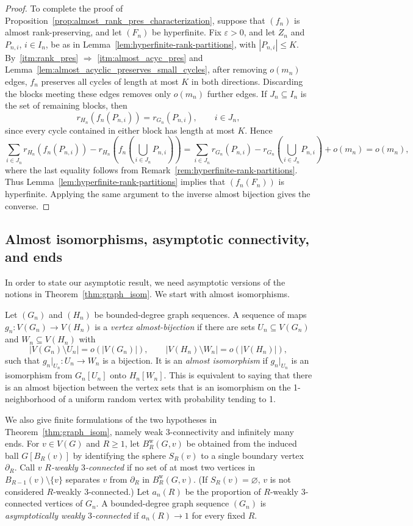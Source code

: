 \documentclass{article}
\theoremstyle{plain}
\theoremstyle{definition}
\begin{document}
\begin{proof}
To complete the proof of Proposition~\ref{prop:almost_rank_pres_characterization}, suppose that $(f_n)$ is almost rank-preserving, and let $(F_n)$ be hyperfinite. Fix $\varepsilon>0$, and let $Z_n$ and $P_{n,i}$, $i\in I_n$, be as in Lemma~\ref{lem:hyperfinite-rank-partitions}, with $|P_{n,i}|\leq K$. By~\ref{itm:rank_pres} $\Rightarrow$ \ref{itm:almost_acyc_pres} and Lemma~\ref{lem:almost_acyclic_preserves_small_cycles}, after removing $o(m_n)$ edges, $f_n$ preserves all cycles of length at most $K$ in both directions. Discarding the blocks meeting these edges removes only $o(m_n)$ further edges. If $J_n\subseteq I_n$ is the set of remaining blocks, then
\[
r_{H_n}(f_n(P_{n,i}))=r_{G_n}(P_{n,i}),\qquad i\in J_n,
\]
since every cycle contained in either block has length at most $K$. Hence
\[
\sum_{i\in J_n} r_{H_n}(f_n(P_{n,i}))-r_{H_n}\left(f_n\left(\bigcup_{i\in J_n}P_{n,i}\right)\right)=\sum_{i\in J_n} r_{G_n}(P_{n,i})-r_{G_n}\left(\bigcup_{i\in J_n}P_{n,i}\right)+o(m_n)=o(m_n),
\]
where the last equality follows from Remark~\ref{rem:hyperfinite-rank-partitions}. Thus Lemma~\ref{lem:hyperfinite-rank-partitions} implies that $(f_n(F_n))$ is hyperfinite. Applying the same argument to the inverse almost bijection gives the converse.\end{proof}

\subsection{Almost isomorphisms, asymptotic connectivity, and ends}

In order to state our asymptotic result, we need asymptotic versions of the notions in Theorem~\ref{thm:graph_isom}. We start with almost isomorphisms.

Let $(G_n)$ and $(H_n)$ be bounded-degree graph sequences. A sequence of maps $g_n:V(G_n)\to V(H_n)$ is a \emph{vertex almost-bijection} if there are sets $U_n\subseteq V(G_n)$ and $W_n\subseteq V(H_n)$ with
\[
    |V(G_n)\setminus U_n|=o(|V(G_n)|),
    \qquad
    |V(H_n)\setminus W_n|=o(|V(H_n)|),
\]
such that $g_n|_{U_n}:U_n\to W_n$ is a bijection. It is an \emph{almost isomorphism} if $g_n|_{U_n}$ is an isomorphism from $G_n[U_n]$ onto $H_n[W_n]$. This is equivalent to saying that there is an almost bijection between the vertex sets that is an isomorphism on the 1-neighborhood of a uniform random vertex with probability tending to 1.

We also give finite formulations of the two hypotheses in Theorem~\ref{thm:graph_isom}, namely weak 3-connectivity and infinitely many ends. For $v\in V(G)$ and $R\geq 1$, let $B_R^{\mathrm w}(G,v)$ be obtained from the induced ball $G[B_R(v)]$ by identifying the sphere $S_R(v)$ to a single boundary vertex $\partial_R$. Call $v$ \emph{$R$-weakly $3$-connected} if no set of at most two vertices in $B_{R-1}(v)\setminus\{v\}$ separates $v$ from $\partial_R$ in $B_R^{\mathrm w}(G,v)$. (If $S_R(v)=\varnothing$, $v$ is not considered $R$-weakly $3$-connected.) Let $a_n(R)$ be the proportion of $R$-weakly $3$-connected vertices of $G_n$. A bounded-degree graph sequence $(G_n)$ is \emph{asymptotically weakly $3$-connected} if $a_n(R)\to 1$ for every fixed $R$.
\end{document}
